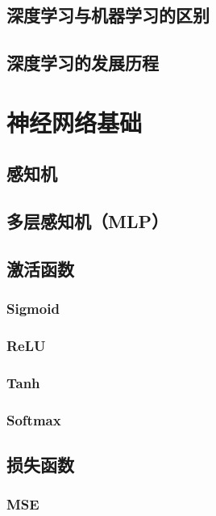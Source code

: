 \documentclass[12pt,UTF8]{ctexbook}
\begin{document}
\section{深度学习与机器学习的区别}

\section{深度学习的发展历程}

\chapter{神经网络基础}
\label{chap:nn_basics}

\section{感知机}

\section{多层感知机（MLP）}

\section{激活函数}

\subsection{Sigmoid}

\subsection{ReLU}

\subsection{Tanh}

\subsection{Softmax}

\section{损失函数}

\subsection{MSE}
\end{document}
